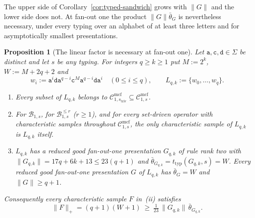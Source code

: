 \documentclass[11pt]{article}
\numberwithin{equation}{section}
\theoremstyle{plain}
\newtheorem{proposition}[theorem]{Proposition}
\theoremstyle{definition}
\theoremstyle{remark}
\newcommand{\Cmcf}[2]{\mathcal{C}^{\mathrm{mcf}}_{#1,#2}}
\begin{document}
The upper side of Corollary~\ref{cor:typed-sandwich} grows with $\|G\|$ and
the lower side does not.  At fan-out one the product $\|G\|\bar\theta_G$ is
nevertheless necessary, under every typing over an alphabet of at least three
letters and for asymptotically smallest presentations.

\begin{proposition}[The linear factor is necessary at fan-out one]
\label{prop:linear-factor-sharp}
Let $\mathtt a,\mathtt c,\mathtt d\in\Sigma$ be distinct and let $s$ be any
typing.  For integers $q\ge k\ge1$ put $M:=2^k$, $W:=M+2q+2$ and
\[
 w_i:=\mathtt a^i\mathtt d\mathtt a^{q-i}\mathtt c^M\mathtt a^{q-i}\mathtt d
 \mathtt a^i\quad(0\le i\le q),\qquad L_{q,k}:=\{w_0,\ldots,w_q\}.
\]
\begin{enumerate}[label=\textup{(\roman*)},leftmargin=*]
\item Every subset of $L_{q,k}$ belongs to
$\Cmcf{1}{s_{\mathrm{triv}}}\subseteq\Cmcf{1}{s}$.
\item For $\mathcal B_{1,s}$, for $\mathcal B^{\le r}_{1,s}$ \textup($r\ge1$\textup),
and for every set-driven operator with characteristic samples throughout
$\Cmcf{1}{s}$, the only characteristic sample of $L_{q,k}$ is $L_{q,k}$ itself.
\item $L_{q,k}$ has a reduced good fan-out-one presentation $G_{q,k}$ of rule
rank two with $\|G_{q,k}\|=17q+6k+13\le23(q+1)$ and
$\bar\theta_{G_{q,k}}=t_{\mathrm{typ}}(G_{q,k},s)=W$.  Every reduced good
fan-out-one presentation $G$ of $L_{q,k}$ has $\bar\theta_G=W$ and
$\|G\|\ge q+1$.
\end{enumerate}
Consequently every characteristic sample $F$ in~\textup{(ii)} satisfies
\[
 \|F\|_+=(q+1)(W+1)\ \ge\ \tfrac1{23}\,\|G_{q,k}\|\,\bar\theta_{G_{q,k}}.
\]
\end{proposition}
\end{document}
